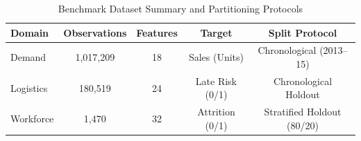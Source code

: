 \begin{table}[htbp]
\caption{Benchmark Dataset Summary and Partitioning Protocols}
\begin{center}
\begin{tabular}{lcccc}
\toprule
\textbf{Domain} & \textbf{Observations} & \textbf{Features} & \textbf{Target} & \textbf{Split Protocol} \\
\midrule
Demand & 1,017,209 & 18 & Sales (Units) & Chronological (2013--15) \\
Logistics & 180,519 & 24 & Late Risk (0/1) & Chronological Holdout \\
Workforce & 1,470 & 32 & Attrition (0/1) & Stratified Holdout (80/20) \\
\bottomrule
\end{tabular}
\label{tab:datasets}
\end{center}
\end{table}
